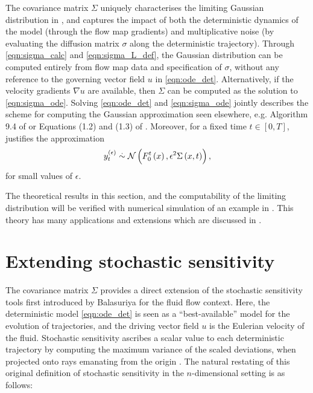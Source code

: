 The covariance matrix \(\Sigma\) uniquely characterises the limiting Gaussian distribution in , and captures the impact of both the deterministic dynamics of the model (through the flow map gradients) and multiplicative noise (by evaluating the diffusion matrix \(\sigma\) along the deterministic trajectory).
Through \eqref{eqn:sigma_calc} and \eqref{eqn:sigma_L_def}, the Gaussian distribution can be computed entirely from flow map data and specification of \(\sigma\), without any reference to the governing vector field \(u\) in \eqref{eqn:ode_det}.
Alternatively, if the velocity gradients \(\nabla u\) are available, then \(\Sigma\) can be computed as the solution to \eqref{eqn:sigma_ode}.
Solving \eqref{eqn:ode_det} and \eqref{eqn:sigma_ode} jointly describes the scheme for computing the Gaussian approximation seen elsewhere, e.g. Algorithm 9.4 of \cite{SarkkaSolin_2019_AppliedStochasticDifferential} or Equations (1.2) and (1.3) of \cite{Sanz-AlonsoStuart_2017_GaussianApproximationsSmall}.
Moreover, for a fixed time \(t \in [0,T]\),  justifies the approximation 
\begin{equation}
	y_t^{\left(\epsilon\right)} \stackrel{.}{\sim} \mathcal{N}\left(F_0^t\left(x\right), \epsilon^2 \Sigma\left(x,t\right)\right),
	\label{eqn:y_t_gauss}
\end{equation}
for small values of \(\epsilon\).

The theoretical results in this section, and the computability of the limiting distribution will be verified with numerical simulation of an example in .
This theory has many applications and extensions which are discussed in .


\section{Extending stochastic sensitivity}\label{sec:theory_s2}

The covariance matrix \(\Sigma\) provides a direct extension of the stochastic sensitivity tools first introduced by Balasuriya \cite{Balasuriya_2020_StochasticSensitivityComputable} for the fluid flow context.
Here, the deterministic model \eqref{eqn:ode_det} is seen as a ``best-available'' model for the evolution of trajectories, and the driving vector field \(u\) is the Eulerian velocity of the fluid.
Stochastic sensitivity ascribes a scalar value to each deterministic trajectory by computing the maximum variance of the scaled deviations, when projected onto rays emanating from the origin \cite{Balasuriya_2020_StochasticSensitivityComputable}.   
The natural restating of this original definition of stochastic sensitivity \cite{Balasuriya_2020_StochasticSensitivityComputable} in the $ n $-dimensional setting is as follows:

